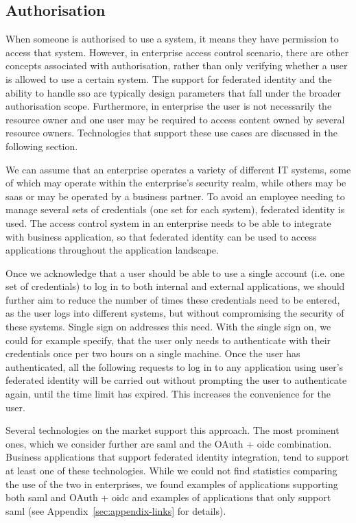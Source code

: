 \subsection{Authorisation}\label{sec:analysis-authorisation}

When someone is authorised to use a system, it means they have permission to access that system. However, in enterprise access control scenario, there are other concepts associated with authorisation, rather than only verifying whether a user is allowed to use a certain system. The support for federated identity and the ability to handle \acrfull{sso} are typically design parameters that fall under the broader authorisation scope. Furthermore, in enterprise the user is not necessarily the resource owner and one user may be required to access content owned by several resource owners. Technologies that support these use cases are discussed in the following section.

We can assume that an enterprise operates a variety of different IT systems, some of which may operate within the enterprise's security realm, while others may be \acrshort{saas} or may be operated by a business partner. To avoid an employee needing to manage several sets of credentials (one set for each system), federated identity is used. The access control system in an enterprise needs to be able to integrate with business application, so that federated identity can be used to access applications throughout the application landscape.

Once we acknowledge that a user should be able to use a single account (i.e. one set of credentials) to log in to both internal and external applications, we should further aim to reduce the number of times these credentials need to be entered, as the user logs into different systems, but without compromising the security of these systems. Single sign on addresses this need. With the single sign on, we could for example specify, that the user only needs to authenticate with their credentials once per two hours on a single machine. Once the user has authenticated, all the following requests to log in to any application using user's federated identity will be carried out without prompting the user to authenticate again, until the time limit has expired. This increases the convenience for the user.

Several technologies on the market support this approach. The most prominent ones, which we consider further are \acrshort{saml} and the OAuth + \acrshort{oidc} combination. Business applications that support federated identity integration, tend to support at least one of these technologies. While we could not find statistics comparing the use of the two in enterprises, we found examples of applications supporting both \acrshort{saml} and OAuth + \acrshort{oidc} and examples of applications that only support \acrshort{saml} (see Appendix~\ref{sec:appendix-links} for details). 

